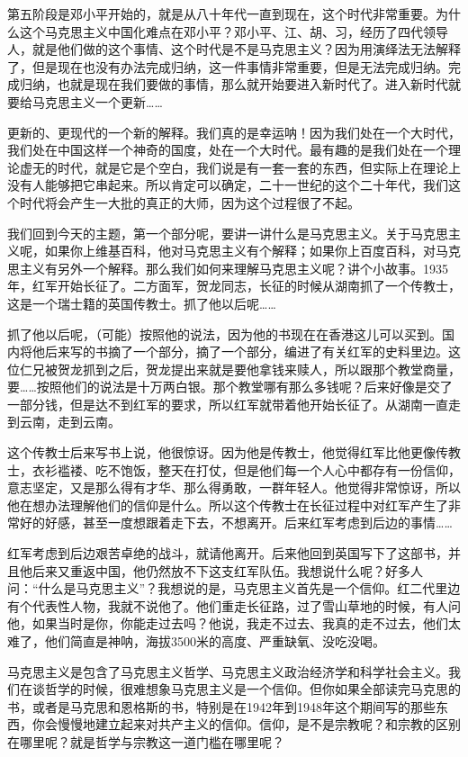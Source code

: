 \documentclass[UTF8, 12pt, a4paper]{ctexrep}
\begin{document}
第五阶段是邓小平开始的，就是从八十年代一直到现在，这个时代非常重要。为什么这个马克思主义中国化难点在邓小平？邓小平、江、胡、习，经历了四代领导人，就是他们做的这个事情、这个时代是不是马克思主义？因为用演绎法无法解释了，但是现在也没有办法完成归纳，这一件事情非常重要，但是无法完成归纳。完成归纳，也就是现在我们要做的事情，那么就开始要进入新时代了。进入新时代就要给马克思主义一个更新……

更新的、更现代的一个新的解释。我们真的是幸运呐！因为我们处在一个大时代，我们处在中国这样一个神奇的国度，处在一个大时代。最有趣的是我们处在一个理论虚无的时代，就是它是个空白，我们说是有一套一套的东西，但实际上在理论上没有人能够把它串起来。所以肯定可以确定，二十一世纪的这个二十年代，我们这个时代将会产生一大批的真正的大师，因为这个过程很了不起。

我们回到今天的主题，第一个部分呢，要讲一讲什么是马克思主义。关于马克思主义呢，如果你上维基百科，他对马克思主义有个解释；如果你上百度百科，对马克思主义有另外一个解释。那么我们如何来理解马克思主义呢？讲个小故事。1935年，红军开始长征了。二方面军，贺龙同志，长征的时候从湖南抓了一个传教士，这是一个瑞士籍的英国传教士。抓了他以后呢……

抓了他以后呢，（可能）按照他的说法，因为他的书现在在香港这儿可以买到。国内将他后来写的书摘了一个部分，摘了一个部分，编进了有关红军的史料里边。这位仁兄被贺龙抓到之后，贺龙提出来就是要他拿钱来赎人，所以跟那个教堂商量，要……按照他们的说法是十万两白银。那个教堂哪有那么多钱呢？后来好像是交了一部分钱，但是达不到红军的要求，所以红军就带着他开始长征了。从湖南一直走到云南，走到云南。

这个传教士后来写书上说，他很惊讶。因为他是传教士，他觉得红军比他更像传教士，衣衫褴褛、吃不饱饭，整天在打仗，但是他们每一个人心中都存有一份信仰，意志坚定，又是那么得有才华、那么得勇敢，一群年轻人。他觉得非常惊讶，所以他在想办法理解他们的信仰是什么。所以这个传教士在长征过程中对红军产生了非常好的好感，甚至一度想跟着走下去，不想离开。后来红军考虑到后边的事情……

红军考虑到后边艰苦卓绝的战斗，就请他离开。后来他回到英国写下了这部书，并且他后来又重返中国，他仍然放不下这支红军队伍。我想说什么呢？好多人问：“什么是马克思主义”？我想说的是，马克思主义首先是一个信仰。红二代里边有个代表性人物，我就不说他了。他们重走长征路，过了雪山草地的时候，有人问他，如果当时是你，你能走过去吗？他说，我走不过去、我真的走不过去，他们太难了，他们简直是神呐，海拔3500米的高度、严重缺氧、没吃没喝。

马克思主义是包含了马克思主义哲学、马克思主义政治经济学和科学社会主义。我们在谈哲学的时候，很难想象马克思主义是一个信仰。但你如果全部读完马克思的书，或者是马克思和恩格斯的书，特别是在1942年到1948年这个期间写的那些东西，你会慢慢地建立起来对共产主义的信仰。信仰，是不是宗教呢？和宗教的区别在哪里呢？就是哲学与宗教这一道门槛在哪里呢？
\end{document}
